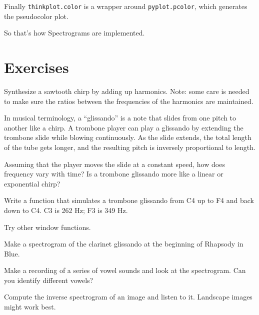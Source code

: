 \documentclass[12pt]{book}
\begin{document}
Finally {\tt thinkplot.color} is a wrapper around {\tt pyplot.pcolor},
which generates the pseudocolor plot.

So that's how Spectrograms are implemented.


\section{Exercises}

\begin{exercise}
Synthesize a sawtooth chirp by adding up harmonics.  Note: some
care is needed to make sure the ratios between the frequencies of
the harmonics are maintained.
\end{exercise}

\begin{exercise}
In musical terminology, a ``glissando'' is a note that slides from one
pitch to another like a chirp.  A trombone player can play a glissando
by extending the trombone slide while blowing continuously.  As the
slide extends, the total length of the tube gets longer, and the
resulting pitch is inversely proportional to length.

Assuming that the player moves the slide at a constant speed, how
does frequency vary with time?  Is a trombone glissando more like
a linear or exponential chirp?

Write a function that simulates a trombone glissando from C4 up to F4
and back down to C4.  C3 is 262 Hz; F3 is 349 Hz.
\end{exercise}


\begin{exercise}
Try other window functions.
\end{exercise}

\begin{exercise}
Make a spectrogram of the clarinet glissando at the beginning of
Rhapsody in Blue.

\end{exercise}

\begin{exercise}
Make a recording of a series of vowel sounds and look at the spectrogram.
Can you identify different vowels?
\end{exercise}

\begin{exercise}
Compute the inverse spectrogram of an image and listen to it.
Landscape images might work best.
\end{exercise}
\end{document}
